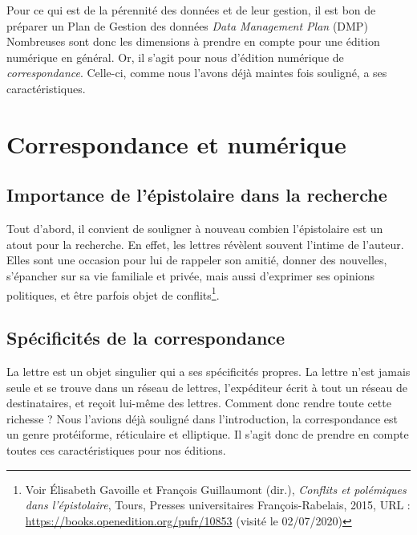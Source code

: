 Pour ce qui est de la pérennité des données et de leur gestion, il est bon de préparer un  Plan de Gestion des données \emph{Data Management Plan} (DMP)   \\

Nombreuses sont donc les dimensions à prendre en compte pour une édition numérique en général. Or, il s'agit pour nous d'édition numérique de \emph{correspondance}. Celle-ci, comme nous l'avons déjà maintes fois souligné, a ses caractéristiques.

\section{Correspondance et numérique}

\subsection{Importance de l'épistolaire dans la recherche}

Tout d'abord, il convient de souligner à nouveau combien l'épistolaire est un atout pour la recherche. En effet, les lettres révèlent souvent l'intime de l'auteur. Elles sont une occasion pour lui de rappeler son amitié, donner des nouvelles, s'épancher sur sa vie familiale et privée, mais aussi d'exprimer ses opinions politiques, et être parfois objet de conflits\footnote{Voir Élisabeth Gavoille et François Guillaumont (dir.), \emph{Conflits et polémiques dans l’épistolaire}, Tours, Presses universitaires François-Rabelais, 2015, URL : \url{https://books.openedition.org/pufr/10853} (visité le 02/07/2020)}.

\subsection{Spécificités de la correspondance}

La lettre est un objet singulier qui a ses spécificités propres.
La lettre n'est jamais seule et se trouve dans un réseau de lettres, l'expéditeur écrit à tout un réseau de destinataires, et reçoit lui-même des lettres. Comment donc rendre toute cette richesse ?
Nous l'avions déjà souligné dans l'introduction, la correspondance est un genre protéiforme, réticulaire et elliptique. Il s'agit donc de prendre en compte toutes ces caractéristiques pour nos éditions.\\

